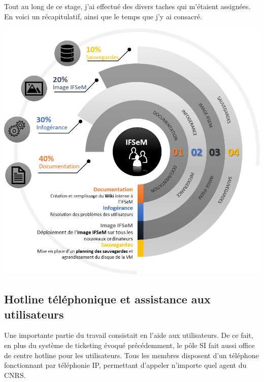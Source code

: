 Tout au long de ce stage, j'ai effectué des divers taches qui m'étaient assignées. En voici un récapitulatif, ainsi que le temps que j'y ai consacré.
\\
\smallbreak
\centerline{
\includegraphics[width=15cm]{./images/temps.png}
}


\subsection{Hotline téléphonique et assistance aux utilisateurs }
Une importante partie du travail consistait en l'aide aux utilisateurs. De ce fait, en plus du système de ticketing évoqué précédemment, le pôle SI fait aussi office de centre hotline pour les utilisateurs. Tous les membres disposent d'un téléphone fonctionnant par téléphonie IP, permettant d'appeler n'importe quel agent du CNRS.

